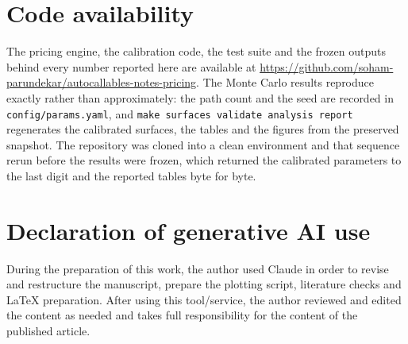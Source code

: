 \section*{Code availability}
The pricing engine, the calibration code, the test suite and the frozen outputs
behind every number reported here are available at
\url{https://github.com/soham-parundekar/autocallables-notes-pricing}. The Monte
Carlo results reproduce exactly rather than approximately: the path count and
the seed are recorded in \texttt{config/params.yaml}, and \texttt{make surfaces
validate analysis report} regenerates the calibrated surfaces, the tables and
the figures from the preserved snapshot. The repository was cloned into a clean
environment and that sequence rerun before the results were frozen, which
returned the calibrated parameters to the last digit and the reported tables
byte for byte.

\section*{Declaration of generative AI use}
During the preparation of this work, the author used Claude in order to revise
and restructure the manuscript, prepare the plotting script, literature checks
and LaTeX preparation. After using this tool/service, the author reviewed and
edited the content as needed and takes full responsibility for the content of
the published article.
